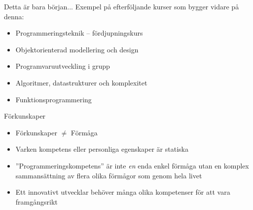 \ifkompendium\else
\begin{SlideExtra}{Detta är bara början... }
Exempel på efterföljande kurser som bygger vidare på denna:
\begin{itemize}
\item Programmeringsteknik -- fördjupningskurs
\item Objektorienterad modellering och design
\item Programvaruutveckling i grupp
\item Algoritmer, datastrukturer och komplexitet
\item Funktionsprogrammering
\end{itemize}
\end{SlideExtra}





\fi


\ifkompendium\else

\begin{SlideExtra}{Förkunskaper}
\begin{itemize}
\item Förkunskaper $\neq$ Förmåga
\item Varken kompetens eller personliga egenskaper är statiska
\item ''Programmeringskompetens'' är inte \textit{en} enda enkel förmåga utan en komplex sammansättning av flera olika förmågor som  genom hela livet
\item Ett innovativt utvecklar behöver många olika kompetenser för att vara framgångsrikt
\end{itemize}
\end{SlideExtra}


